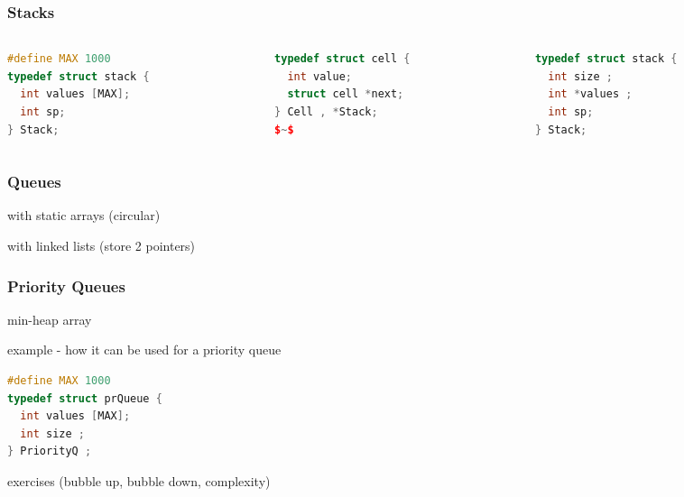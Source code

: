 \documentclass[aspectratio=169]{beamer}
\begin{document}
\begin{frame}[fragile]\frametitle{Stacks}

\begin{columns}
\begin{column}{.32\textwidth}
%
\begin{lstlisting}[language=C++, emph={stack,Stack}]
#define MAX 1000
typedef struct stack {
  int values [MAX];
  int sp;
} Stack;
\end{lstlisting}
%
\end{column}
\begin{column}{.32\textwidth}
%
\begin{lstlisting}[language=C++, emph={stack,Stack}]
typedef struct cell {
  int value;
  struct cell *next;
} Cell , *Stack;
$~$
\end{lstlisting}
%
\end{column}
\begin{column}{.32\textwidth}
%
\begin{lstlisting}[language=C++, emph={stack,Stack}]
typedef struct stack {
  int size ;
  int *values ;
  int sp;
} Stack;
\end{lstlisting}
%
\end{column}
\end{columns}
  




\end{frame}

\begin{frame}\frametitle{Queues}
    
  with static arrays (circular)

  with linked lists (store 2 pointers)
  
\end{frame}


\begin{frame}[fragile]\frametitle{Priority Queues}
      
  min-heap array

  example - how it can be used for a priority queue

\begin{lstlisting}[language=C++,emph={prQueue}]
#define MAX 1000
typedef struct prQueue {
  int values [MAX];
  int size ;
} PriorityQ ;
\end{lstlisting}

  exercises (bubble up, bubble down, complexity)

\end{frame}
\end{document}
